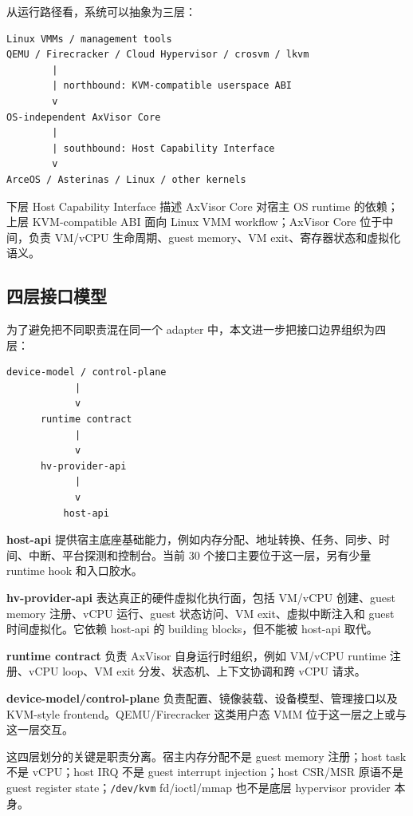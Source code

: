 \documentclass[a4paper,11pt]{article}
\begin{document}
从运行路径看，系统可以抽象为三层：

\begin{lstlisting}
Linux VMMs / management tools
QEMU / Firecracker / Cloud Hypervisor / crosvm / lkvm
        |
        | northbound: KVM-compatible userspace ABI
        v
OS-independent AxVisor Core
        |
        | southbound: Host Capability Interface
        v
ArceOS / Asterinas / Linux / other kernels
\end{lstlisting}

下层 Host Capability Interface 描述 AxVisor Core 对宿主 OS runtime 的依赖；上层 KVM-compatible ABI 面向 Linux VMM workflow；AxVisor Core 位于中间，负责 VM/vCPU 生命周期、guest memory、VM exit、寄存器状态和虚拟化语义。

\subsection{四层接口模型}

为了避免把不同职责混在同一个 adapter 中，本文进一步把接口边界组织为四层：

\begin{lstlisting}
device-model / control-plane
            |
            v
      runtime contract
            |
            v
      hv-provider-api
            |
            v
          host-api
\end{lstlisting}

\textbf{host-api} 提供宿主底座基础能力，例如内存分配、地址转换、任务、同步、时间、中断、平台探测和控制台。当前 30 个接口主要位于这一层，另有少量 runtime hook 和入口胶水。

\textbf{hv-provider-api} 表达真正的硬件虚拟化执行面，包括 VM/vCPU 创建、guest memory 注册、vCPU 运行、guest 状态访问、VM exit、虚拟中断注入和 guest 时间虚拟化。它依赖 host-api 的 building blocks，但不能被 host-api 取代。

\textbf{runtime contract} 负责 AxVisor 自身运行时组织，例如 VM/vCPU runtime 注册、vCPU loop、VM exit 分发、状态机、上下文协调和跨 vCPU 请求。

\textbf{device-model/control-plane} 负责配置、镜像装载、设备模型、管理接口以及 KVM-style frontend。QEMU/Firecracker 这类用户态 VMM 位于这一层之上或与这一层交互。

这四层划分的关键是职责分离。宿主内存分配不是 guest memory 注册；host task 不是 vCPU；host IRQ 不是 guest interrupt injection；host CSR/MSR 原语不是 guest register state；\texttt{/dev/kvm} fd/ioctl/mmap 也不是底层 hypervisor provider 本身。
\end{document}
